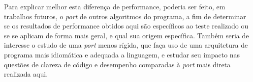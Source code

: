 \documentclass[tg]{mdtufsm}
\begin{document}
Para explicar melhor esta diferença de performance, poderia ser feito, em trabalhos futuros, o \emph{port} de outros algoritmos do programa, a fim de determinar se os resultados de performance obtidos aqui são específicos ao teste realizado ou se se aplicam de forma mais geral, e qual sua origem específica. Também seria de interesse o estudo de uma \emph{port} menos rígida, que faça uso de uma arquitetura de programa mais idiomática e adequada a linguagem, e estudar seu impacto nas questões de clareza de código e desempenho comparadas à \emph{port} mais direta realizada aqui.

\setlength{\baselineskip}{\baselineskip}


\end{document}
